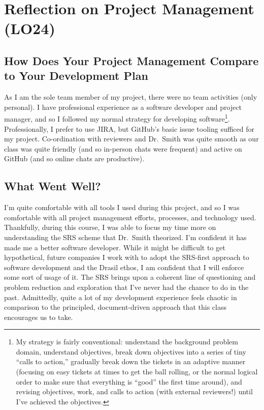 \documentclass{article}
\begin{document}
\section{Reflection on Project Management (LO24)}

\subsection{How Does Your Project Management Compare to Your Development Plan}

As I am the sole team member of my project, there were no team activities (only
personal). I have professional experience as a software developer and project
manager, and so I followed my normal strategy for developing
software\footnote{My strategy is fairly conventional: understand the background
problem domain, understand objectives, break down objectives into a series of
tiny ``calls to action,'' gradually break down the tickets in an adaptive manner
(focusing on easy tickets at times to get the ball rolling, or the normal
logical order to make sure that everything is ``good'' the first time around),
and revising objectives, work, and calls to action (with external reviewers!)
until I've achieved the objectives.}. Professionally, I prefer to use JIRA, but
GitHub's basic issue tooling sufficed for my project. Co-ordination with
reviewers and Dr.~Smith was quite smooth as our class was quite friendly (and so
in-person chats were frequent) and active on GitHub (and so online chats are
productive).

\subsection{What Went Well?}

I'm quite comfortable with all tools I used during this project, and so I was
comfortable with all project management efforts, processes, and technology used.
Thankfully, during this course, I was able to focus my time more on
understanding the SRS scheme that Dr.~Smith theorized. I'm confident it has made
me a better software developer. While it might be difficult to get hypothetical,
future companies I work with to adopt the SRS-first approach to software
development and the Drasil ethos, I am confident that I will enforce some sort
of usage of it. The SRS brings upon a coherent line of questioning and problem
reduction and exploration that I've never had the chance to do in the past.
Admittedly, quite a lot of my development experience feels chaotic in comparison
to the principled, document-driven approach that this class encourages us to
take.
\end{document}
